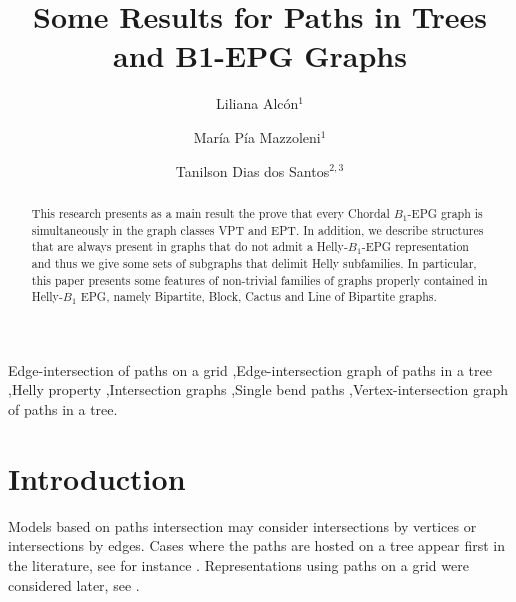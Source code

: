 \documentclass[9pt]{entcs}
\begin{document}
\begin{frontmatter}
  \title{Some Results for Paths in Trees and B1-EPG Graphs}
  
 	\author{Liliana Alc\'{o}n$^{1}$}
 	\author{Mar\'{i}a P\'{i}a Mazzoleni$^{1}$}
 	\author{Tanilson Dias dos Santos$^{2,3}$}
	
 	\address{$^{1}$ Nacional University of La Plata, La Plata, Argentina.\\$^{2}$ Federal University of Rio de Janeiro - UFRJ, Brazil. \\$^{3}$ Federal University of Tocantins - UFT, Brazil.}
	

\begin{abstract}
This research presents as a main result the prove that every Chordal $B_1$-EPG graph is simultaneously in the graph classes VPT and EPT. In addition, we  describe structures that are always present in graphs that do not admit a Helly-$B_1$-EPG representation and thus we give some sets of subgraphs that delimit Helly subfamilies.   
In particular, this paper presents  some features of non-trivial families of graphs properly contained in Helly-$B_1$ EPG, namely Bipartite, Block, Cactus and Line of Bipartite  graphs. 
\end{abstract}
 
\begin{keyword}
Edge-intersection of paths on a grid \sep Edge-intersection graph of paths in a tree  \sep Helly property \sep Intersection graphs \sep Single bend paths \sep Vertex-intersection graph of paths in a tree.
\end{keyword} 



\end{frontmatter}


\section{Introduction}

Models based on paths intersection  may consider  intersections by vertices or   intersections by edges.  Cases where the paths are hosted on a tree  appear first in the literature, see for instance \cite{gavril1978recognition, golumbic1985edge, golumbic1985}.  Representations using paths on a grid were considered later, see  \cite{golumbic2009,golumbic2013, golumbic2013intersection}. %
\end{document}
